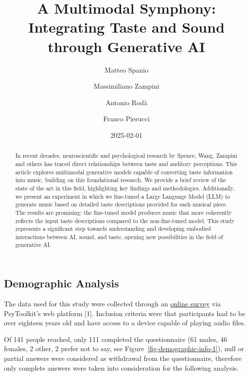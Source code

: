 \documentclass[
  letterpaper,
  DIV=11,
  numbers=noendperiod]{scrartcl}
\title{A Multimodal Symphony: Integrating Taste and Sound through
Generative AI}
\author{Matteo Spanio \and Massimiliano Zampini \and Antonio
Rodà \and Franco Pierucci}
\date{2025-02-01}
\begin{document}
\maketitle
\begin{abstract}
In recent decades, neuroscientific and psychological research by Spence,
Wang, Zampini and others has traced direct relationships between taste
and auditory perceptions. This article explores multimodal generative
models capable of converting taste information into music, building on
this foundational research. We provide a brief review of the state of
the art in this field, highlighting key findings and methodologies.
Additionally, we present an experiment in which we fine-tuned a Large
Language Model (LLM) to generate music based on detailed taste
descriptions provided for each musical piece. The results are promising:
the fine-tuned model produces music that more coherently reflects the
input taste descriptions compared to the non-fine-tuned model. This
study represents a significant step towards understanding and developing
embodied interactions between AI, sound, and taste, opening new
possibilities in the field of generative AI.
\end{abstract}


\subsection{Demographic Analysis}\label{demographic-analysis}

The data used for this study were collected through an
\href{https://www.psytoolkit.org/c/3.4.6/survey?s=YmxcY}{online survey}
via PsyToolkit's web platform {[}1{]}. Inclusion criteria were that
participants had to be over eighteen years old and have access to a
device capable of playing audio files.

Of 141 people reached, only 111 completed the questionnaire (61 males,
46 females, 2 other, 2 prefer not to say, see
Figure~\ref{fig-demographic-info-1}), null or partial answers were
considered as withdrawal from the questionnaire, therefore only complete
answers were taken into consideration for the following analysis.
\end{document}

